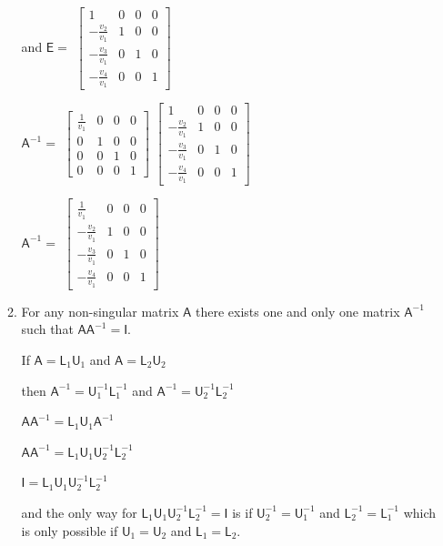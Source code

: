 \documentclass[a4paper, 11pt]{article}
\newcommand{\mat}[1]{\boldsymbol { \mathsf{#1}} }
\begin{document}
\begin{enumerate}
\begin{enumerate}[label=(\alph*)]
and $\mat{E} = $
$\begin{bmatrix} 
       1 & 0 & 0 & 0 \\ 
       -\frac{v_2}{v_1} & 1 & 0 & 0 \\
       -\frac{v_3}{v_1} & 0 & 1 & 0 \\
       -\frac{v_4}{v_1} & 0 & 0 & 1 
\end{bmatrix}$

$\mat{A}^{-1} = $
$\begin{bmatrix} 
       \frac{1}{v_1} & 0 & 0 & 0 \\ 
       0 & 1 & 0 & 0 \\
       0 & 0 & 1 & 0 \\
       0 & 0 & 0 & 1 
\end{bmatrix}$ 
$\begin{bmatrix} 
       1 & 0 & 0 & 0 \\ 
       -\frac{v_2}{v_1} & 1 & 0 & 0 \\
       -\frac{v_3}{v_1} & 0 & 1 & 0 \\
       -\frac{v_4}{v_1} & 0 & 0 & 1 
\end{bmatrix}$

$\mat{A}^{-1} = $
$\begin{bmatrix} 
        \frac{1}{v_1} & 0 & 0 & 0 \\ 
       -\frac{v_2}{v_1} & 1 & 0 & 0 \\
       -\frac{v_3}{v_1} & 0 & 1 & 0 \\
       -\frac{v_4}{v_1} & 0 & 0 & 1 
\end{bmatrix}$


\item For any non-singular matrix $\mat{A}$ there exists one and only one matrix $\mat{A}^{-1}$ such that $\mat{AA}^{-1} = \mat{I}.$ \cite{one}

If $\mat{A} = \mat{L}_{1}\mat{U}_{1}$ and $\mat{A} = \mat{L}_{2}\mat{U}_{2}$ 

then $\mat{A}^{-1} = \mat{U}_1^{-1}\mat{L}_1^{-1}$ and $\mat{A}^{-1} = \mat{U}_2^{-1}\mat{L}_2^{-1}$ 

$\mat{AA}^{-1} = \mat{L}_{1}\mat{U}_{1}\mat{A}^{-1}$

$\mat{AA}^{-1} = \mat{L}_{1}\mat{U}_{1}\mat{U}_2^{-1}\mat{L}_2^{-1}$

$\mat{I} =  \mat{L}_{1}\mat{U}_{1}\mat{U}_2^{-1}\mat{L}_2^{-1}$

and the only way for $\mat{L}_{1}\mat{U}_{1}\mat{U}_2^{-1}\mat{L}_2^{-1} = \mat{I}$ is if $\mat U_2^{-1} = \mat U_1^{-1}$ and $\mat L_2^{-1} = \mat L_1^{-1}$ which is only possible if $\mat U_1 = \mat U_2$ and $\mat L_1 = \mat L_2.$


\end{enumerate}
\end{enumerate}
\end{document}
